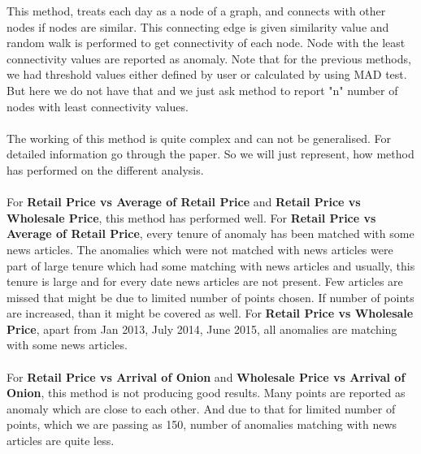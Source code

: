 \documentclass[a4paper,10pt]{report}
\begin{document}
	This method, treats each day as a node of a graph, and connects with other nodes if nodes are similar. This connecting edge is given similarity value and random walk is performed to get connectivity of each node. Node with the least connectivity values are reported as anomaly. Note that for the previous methods, we had threshold values either defined by user or calculated by using MAD test. But here we do not have that and we just ask method to report "n" number of nodes with least connectivity values.\\
	\\
	The working of this method is quite complex and can not be generalised. For detailed information go through the paper. So we will just represent, how method has performed on the different analysis.\\
	\\
	For \textbf{Retail Price vs Average of Retail Price} and \textbf{Retail Price vs Wholesale Price}, this method has performed well. For \textbf{Retail Price vs Average of Retail Price}, every tenure of anomaly has been matched with some news articles. The anomalies which were not matched with news articles were part of large tenure which had some matching with news articles and usually, this tenure is large and for every date news articles are not present. Few articles are missed that might be due to limited number of points chosen. If number of points are increased, than it might be covered as well. For \textbf{Retail Price vs Wholesale Price}, apart from Jan 2013, July 2014, June 2015, all anomalies are matching with some news articles.\\
	\\
	For \textbf{Retail Price vs Arrival of Onion} and \textbf{Wholesale Price vs Arrival of Onion}, this method is not producing good results. Many points are reported as anomaly which are close to each other. And due to that for limited number of points, which we are passing as 150, number of anomalies matching with news articles are quite less.
	
	

			
\end{document}
